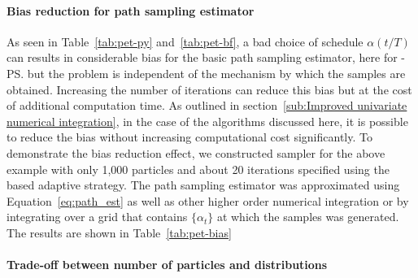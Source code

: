 \paragraph{Bias reduction for path sampling estimator}



As seen in Table~\ref{tab:pet-py} and~\ref{tab:pet-bf}, a bad choice of
schedule $\alpha(t/T)$ can results in considerable bias for the basic path
sampling estimator, here for \smc[2]-\ps but the problem is independent of the
mechanism by which the samples are obtained. Increasing the number of
iterations can reduce this bias but at the cost of additional computation
time. As outlined in section~\ref{sub:Improved univariate numerical
  integration}, in the case of the \smc algorithms discussed here, it is
possible to reduce the bias without increasing computational cost
significantly. To demonstrate the bias reduction effect, we constructed \smc
sampler for the above \pet example with only 1,000 particles and about 20
iterations specified using the \cess based adaptive strategy. The path
sampling estimator was approximated using Equation~\eqref{eq:path_est} as well
as other higher order numerical integration or by integrating over a grid that
contains $\{\alpha_t\}$ at which the samples was generated. The results are
shown in Table~\ref{tab:pet-bias}

\paragraph{Trade-off between number of particles and distributions}


